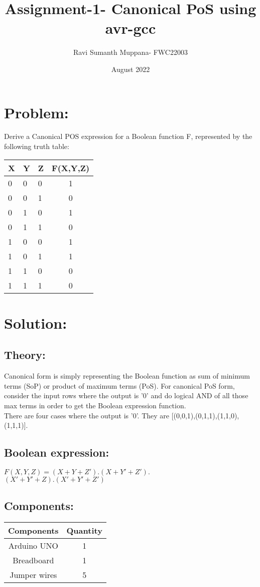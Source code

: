 \documentclass[a4paper,12pt,twocolumn]{article}
\title{Assignment-1- Canonical PoS using avr-gcc}
\author{Ravi Sumanth Muppana- FWC22003}
\date{August 2022}
\begin{document}
\maketitle

\section{Problem:}
Derive a Canonical POS expression for a Boolean function F, represented by the following truth table:

\begin{tabular}{|l|l|l|c|}
	\hline
	X&Y&Z&F(X,Y,Z)\\
	\hline
	0&0&0&1\\
	0&0&1&0\\
	0&1&0&1\\
	0&1&1&0\\
	1&0&0&1\\
	1&0&1&1\\
	1&1&0&0\\
	1&1&1&0\\
	\hline
\end{tabular}

\maketitle\section{Solution:}
\subsection{Theory:}
Canonical form is simply representing the Boolean function as sum of minimum terms (SoP) or product of maximum terms (PoS). For canonical PoS form, consider the input rows where the output is '0' and do logical AND of all those max terms in order to get the Boolean expression function.\\
There are four cases where the output is '0'. They are [(0,0,1),(0,1,1),(1,1,0),(1,1,1)]. 
\subsection{Boolean expression:}
$F(X,Y,Z)=(X+Y+Z').(X+Y'+Z').$\\$(X'+Y'+Z).(X'+Y'+Z')$

\newpage
\subsection{Components:} 
\begin{tabular}{|c|c|}
	\hline
	Components&Quantity\\
	\hline
	Arduino UNO & 1\\
	Breadboard&1\\
	Jumper wires&5\\
	\hline
\end{tabular}
\end{document}
